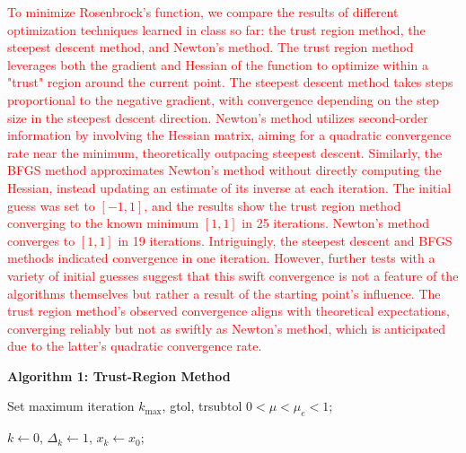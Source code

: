 \documentclass[11pt]{article}
\begin{document}
\begin{enumerate}
\begin{enumerate}
\textcolor{red}{To minimize Rosenbrock's function, we compare the results of different optimization techniques learned in class so far: the trust region method, the steepest descent method, and Newton's method. The trust region method leverages both the gradient and Hessian of the function to optimize within a "trust" region around the current point. The steepest descent method takes steps proportional to the negative gradient, with convergence depending on the step size in the steepest descent direction. Newton's method utilizes second-order information by involving the Hessian matrix, aiming for a quadratic convergence rate near the minimum, theoretically outpacing steepest descent. Similarly, the BFGS method approximates Newton's method without directly computing the Hessian, instead updating an estimate of its inverse at each iteration. The initial guess was set to $[-1,1]$, and the results show the trust region method converging to the known minimum $[1,1]$ in 25 iterations. Newton's method converges to $[1,1]$ in 19 iterations. Intriguingly, the steepest descent and BFGS methods indicated convergence in one iteration. However, further tests with a variety of initial guesses suggest that this swift convergence is not a feature of the algorithms themselves but rather a result of the starting point's influence. The trust region method's observed convergence aligns with theoretical expectations, converging reliably but not as swiftly as Newton's method, which is anticipated due to the latter's quadratic convergence rate.}

  \end{enumerate}
   \end{enumerate} 



\textbf{Algorithm 1: Trust-Region Method}

\quad Set maximum iteration $k_{\max}$, gtol, trsubtol $0 < \mu < \mu_e < 1$;

\vspace{-.15cm}

\quad $k \leftarrow 0$, $\Delta_k \leftarrow 1$, $x_k \leftarrow x_0$;
\end{document}
